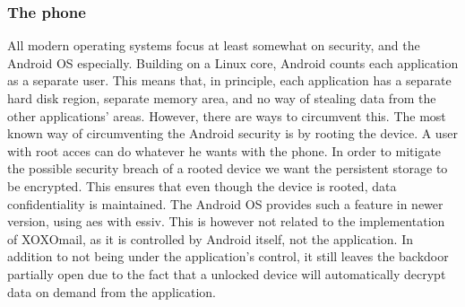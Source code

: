 \subsubsection{The phone}
All modern operating systems focus at least somewhat on security, and the Android OS especially. Building on a Linux core, Android counts each application as a separate user. This means that, in principle, each application has a separate hard disk region, separate memory area, and no way of stealing data from the other applications’ areas. However, there are ways to circumvent this.
\newline
\newline
The most known way of circumventing the Android security is by rooting the device. A user with root acces can do whatever he wants with the phone.
\newline
\newline
In order to mitigate the possible security breach of a rooted device we want the persistent storage to be encrypted. This ensures that even though the device is rooted, data confidentiality is maintained. The Android OS provides such a feature in newer version, using \gls{aes} with \gls{essiv}. This is however not related to the implementation of XOXOmail, as it is controlled by Android itself, not the application. In addition to not being under the application's control, it still leaves the backdoor partially open due to the fact that a unlocked device will automatically decrypt data on demand from the application. 
\newline
\newline
